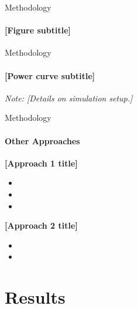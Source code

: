 \documentclass[t,pdf,aspectratio=169]{beamer}
\newcommand{\ph}[1]{[#1]}
\begin{document}
\begin{frame}{Methodology}
  \framesubtitle{\ph{Figure subtitle}}
  \vfill
  \begin{figure}[htb]
    \centering
  \end{figure}
  \vfill
\end{frame}

\begin{frame}{Methodology}
  \framesubtitle{\ph{Power curve subtitle}}
  \vfill
  \begin{figure}[h]
    \centering
  \end{figure}
  \textcolor{PRIMARY-light}{\textit{Note: \ph{Details on simulation setup.}}}
  \vfill
\end{frame}

\begin{frame}{Methodology}
  \framesubtitle{Other Approaches}
  \vfill
  \textcolor{PRIMARY}{\textbf{\ph{Approach 1 title}}}
  \scriptsize
  \begin{itemize}
    \item[-] \ph{Approach 1, item 1}
    \item[-] \ph{Approach 1, item 2}
    \item[-] \ph{Approach 1, item 3}
  \end{itemize}
  \bigskip
  \normalsize
  \textcolor{PRIMARY}{\textbf{\ph{Approach 2 title}}}
  \scriptsize
  \begin{itemize}
    \item[-] \ph{Approach 2, item 1}
    \item[-] \ph{Approach 2, item 2}
  \end{itemize}
  \vfill
\end{frame}


\section{Results}
\end{document}
